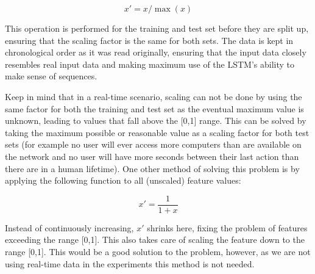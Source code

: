 \begin{equation} \label{eq:normalize}
x' = x / \max (x)
\end{equation}

This operation is performed for the training and test set before they are split up, ensuring that the scaling factor is the same for both sets. The data is kept in chronological order as it was read originally, ensuring that the input data closely resembles real input data and making maximum use of the LSTM's ability to make sense of sequences.

Keep in mind that in a real-time scenario, scaling can not be done by using the same factor for both the training and test set as the eventual maximum value is unknown, leading to values that fall above the [0,1] range. This can be solved by taking the maximum possible or reasonable value as a scaling factor for both test sets (for example no user will ever access more computers than are available on the network and no user will have more seconds between their last action than there are in a human lifetime). One other method of solving this problem is by applying the following function to all (unscaled) feature values:

\begin{equation} \label{eq:normalize_2}
x' = \dfrac{1}{1+x}
\end{equation}

Instead of continuously increasing, \(x'\) shrinks here, fixing the problem of features exceeding the range [0,1]. This also takes care of scaling the feature down to the range [0,1]. This would be a good solution to the problem, however, as we are not using real-time data in the experiments this method is not needed.

